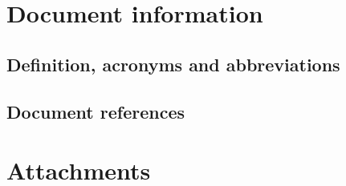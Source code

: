 \section{Document information}

\subsection{Definition, acronyms and abbreviations}

\subsection{Document references}

\section{Attachments}

